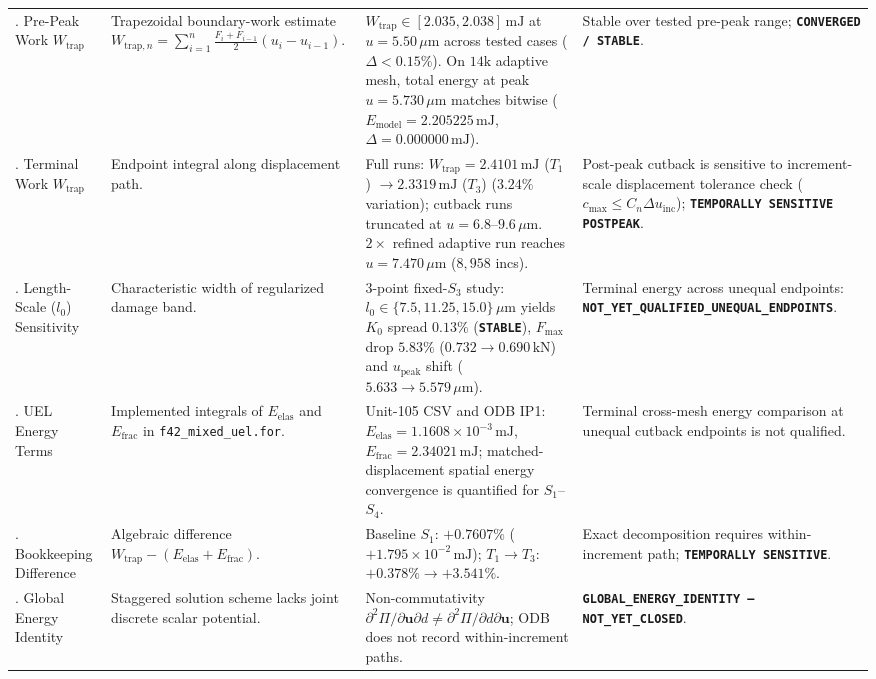 \begin{table}[htbp]
\begin{tabularx}{\textwidth}{p{2.2cm}p{3.8cm}p{4.2cm}X}
\addlinespace
4. Pre-Peak Work $W_{\mathrm{trap}}$ & Trapezoidal boundary-work estimate $W_{\mathrm{trap},n} = \sum_{i=1}^{n} \frac{F_i+F_{i-1}}{2}(u_i-u_{i-1})$. & $W_{\mathrm{trap}} \in [2.035, 2.038]\,\mathrm{mJ}$ at $u = 5.50\,\mu\mathrm{m}$ across tested cases ($\Delta < 0.15\%$). On $14\mathrm{k}$ adaptive mesh, total energy at peak $u = 5.730\,\mu\mathrm{m}$ matches bitwise ($E_{\mathrm{model}} = 2.205225\,\mathrm{mJ}$, $\Delta = 0.000000\,\mathrm{mJ}$). & Stable over tested pre-peak range; \textbf{\texttt{CONVERGED / STABLE}}. \\
\addlinespace
5. Terminal Work $W_{\mathrm{trap}}$ & Endpoint integral along displacement path. & Full runs: $W_{\mathrm{trap}} = 2.4101\,\mathrm{mJ}$ ($T_1$) $\to 2.3319\,\mathrm{mJ}$ ($T_3$) ($3.24\%$ variation); cutback runs truncated at $u=6.8$--$9.6\,\mu\mathrm{m}$. $2\times$ refined adaptive run reaches $u = 7.470\,\mu\mathrm{m}$ ($8{,}958$ incs). & Post-peak cutback is sensitive to increment-scale displacement tolerance check ($c_{\max} \le C_n \Delta u_{\mathrm{inc}}$); \textbf{\texttt{TEMPORALLY SENSITIVE POSTPEAK}}. \\
\addlinespace
6. Length-Scale ($l_0$) Sensitivity & Characteristic width of regularized damage band. & 3-point fixed-$S_3$ study: $l_0 \in \{7.5, 11.25, 15.0\}\,\mu\mathrm{m}$ yields $K_0$ spread $0.13\%$ (\textbf{\texttt{STABLE}}), $F_{\max}$ drop $5.83\%$ ($0.732 \to 0.690\,\mathrm{kN}$) and $u_{\mathrm{peak}}$ shift ($5.633 \to 5.579\,\mu\mathrm{m}$). & Terminal energy across unequal endpoints: \textbf{\texttt{NOT\_YET\_QUALIFIED\_UNEQUAL\_ENDPOINTS}}. \\
\addlinespace
7. UEL Energy Terms & Implemented integrals of $E_{\mathrm{elas}}$ and $E_{\mathrm{frac}}$ in \nolinkurl{f42_mixed_uel.for}. & Unit-105 CSV and ODB IP1: $E_{\mathrm{elas}} = 1.1608\times 10^{-3}\,\mathrm{mJ}$, $E_{\mathrm{frac}} = 2.34021\,\mathrm{mJ}$; matched-displacement spatial energy convergence is quantified for $S_1$--$S_4$. & Terminal cross-mesh energy comparison at unequal cutback endpoints is not qualified. \\
\addlinespace
8. Bookkeeping Difference & Algebraic difference $W_{\mathrm{trap}} - (E_{\mathrm{elas}} + E_{\mathrm{frac}})$. & Baseline $S_1$: $+0.7607\%$ ($+1.795\times 10^{-2}\,\mathrm{mJ}$); $T_1 \to T_3$: $+0.378\% \to +3.541\%$. & Exact decomposition requires within-increment path; \textbf{\texttt{TEMPORALLY SENSITIVE}}. \\
\addlinespace
9. Global Energy Identity & Staggered solution scheme lacks joint discrete scalar potential. & Non-commutativity $\partial^2 \Pi / \partial \mathbf{u} \partial d \ne \partial^2 \Pi / \partial d \partial \mathbf{u}$; ODB does not record within-increment paths. & \textbf{\texttt{GLOBAL\_ENERGY\_IDENTITY --- NOT\_YET\_CLOSED}}. \\

\end{tabularx}
\end{table}
